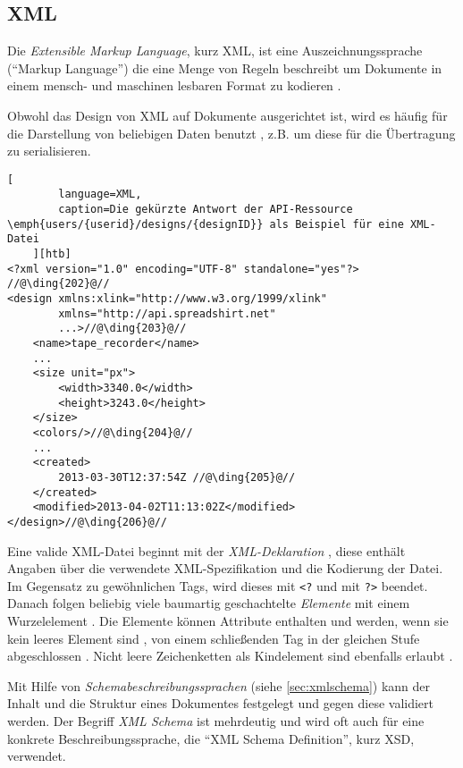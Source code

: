 \subsection{XML}
\label{sec:xml}

\begin{thesisDefinition}[XML]
Die \emph{Extensible Markup Language}, kurz \gls{XML}, ist eine Auszeichnungssprache (\enquote{Markup Language}) die eine Menge von Regeln beschreibt um Dokumente in einem mensch- und maschinen lesbaren Format zu kodieren \cite{XML10Specification}.
\end{thesisDefinition}
Obwohl das Design von XML auf Dokumente ausgerichtet ist, wird es häufig für die Darstellung von beliebigen Daten benutzt \cite{wiki:xml}, z.B. um diese für die Übertragung zu serialisieren.

\begin{lstlisting}[
        language=XML, 
        caption=Die gekürzte Antwort der API-Ressource \emph{users/{userid}/designs/{designID}} als Beispiel für eine XML-Datei
    ][htb]
<?xml version="1.0" encoding="UTF-8" standalone="yes"?> //@\ding{202}@//
<design xmlns:xlink="http://www.w3.org/1999/xlink" 
        xmlns="http://api.spreadshirt.net" 
        ...>//@\ding{203}@//
    <name>tape_recorder</name>
    ...
    <size unit="px">
        <width>3340.0</width>
        <height>3243.0</height>
    </size>
    <colors/>//@\ding{204}@//
    ...
    <created>
        2013-03-30T12:37:54Z //@\ding{205}@//
    </created>
    <modified>2013-04-02T11:13:02Z</modified>
</design>//@\ding{206}@//
\end{lstlisting}

Eine valide XML-Datei beginnt mit der \emph{XML-Deklaration} , diese enthält Angaben über die verwendete XML-Spezifikation und die Kodierung der Datei. 
Im Gegensatz zu gewöhnlichen Tags, wird dieses mit \texttt{<?} und mit \texttt{?>} beendet. 
Danach folgen beliebig viele baumartig geschachtelte \emph{Elemente} mit einem Wurzelelement . Die Elemente können Attribute enthalten und werden, wenn sie kein leeres Element sind , von einem schließenden Tag in der gleichen Stufe abgeschlossen . Nicht leere Zeichenketten als Kindelement sind ebenfalls erlaubt .

Mit Hilfe von \emph{Schemabeschreibungssprachen} (siehe \cref{sec:xmlschema}) kann der Inhalt und die Struktur eines Dokumentes festgelegt und gegen diese validiert werden. Der Begriff \emph{XML Schema} ist mehrdeutig und wird oft auch für eine konkrete Beschreibungssprache, die \enquote{XML Schema Definition}, kurz \gls{XSD}, verwendet.
